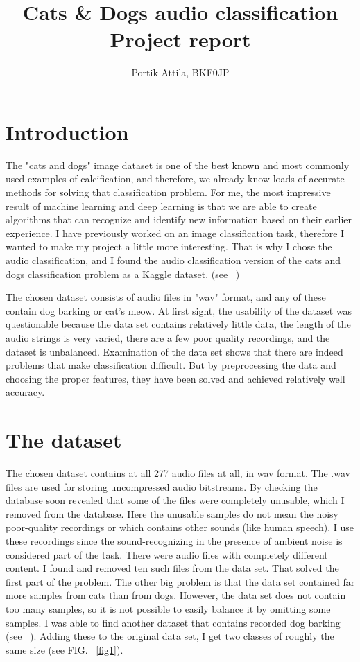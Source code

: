 \documentclass[12pt a4paper]{article}
\numberwithin{equation}{section}
\begin{document}
\thispagestyle{empty}
\begin{titlepage}
\title{Cats \& Dogs audio classification \\ Project report}  
\author{Portik Attila, BKF0JP}
\end{titlepage}
\maketitle


\section{Introduction}
The "cats and dogs" image dataset is one of the best known and most commonly used examples of calcification, and therefore, we already know loads of accurate methods for solving that classification problem.  For me, the most impressive result of machine learning and deep learning is that we are able to create algorithms that can recognize and identify new information based on their earlier experience. I have previously worked on an image classification task, therefore I wanted to make my project a little more interesting. That is why I chose the audio classification, and I found the audio classification version of the cats and dogs classification problem as a Kaggle dataset. (see ~\cite{data})


The chosen dataset consists of audio files in "wav" format, and any of these contain dog barking or cat's meow. At first sight, the usability of the dataset was questionable because the data set contains relatively little data, the length of the audio strings is very varied, there are a few poor quality recordings, and the dataset is unbalanced. Examination of the data set shows that there are indeed problems that make classification difficult. But by preprocessing the data and choosing the proper features, they have been solved and achieved relatively well accuracy. 

\section{The dataset}

The chosen dataset contains at all 277 audio files at all, in wav format. The .wav files are used for storing uncompressed audio bitstreams. By checking the database soon revealed that some of the files were completely unusable, which I removed from the database. 
Here the unusable samples do not mean the noisy poor-quality recordings or which contains other sounds (like human speech). I use these recordings since the sound-recognizing in the presence of ambient noise is considered part of the task. There were audio files with completely different content. I found and removed ten such files from the data set. That solved the first part of the problem. The other big problem is that the data set contained far more samples from cats than from dogs. However, the data set does not contain too many samples, so it is not possible to easily balance it by omitting some samples. I was able to find another dataset that contains recorded dog barking (see ~\cite{data2}).  Adding these to the original data set, I get two classes of roughly the same size (see FIG. ~\ref{fig1}). 
\end{document}
